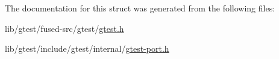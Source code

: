 The documentation for this struct was generated from the following files\-:\begin{DoxyCompactItemize}
\item 
lib/gtest/fused-\/src/gtest/\hyperlink{fused-src_2gtest_2gtest_8h}{gtest.\-h}\item 
lib/gtest/include/gtest/internal/\hyperlink{gtest-port_8h}{gtest-\/port.\-h}\end{DoxyCompactItemize}
